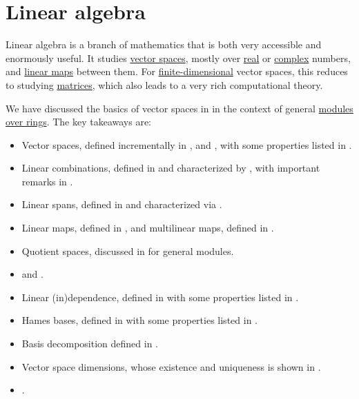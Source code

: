 \section{Linear algebra}\label{sec:linear_algebra}

Linear algebra is a branch of mathematics that is both very accessible and enormously useful. It studies \hyperref[def:vector_space]{vector spaces}, mostly over \hyperref[def:set_of_real_numbers]{real} or \hyperref[def:set_of_complex_numbers]{complex} numbers, and \hyperref[def:semimodule/homomorphism]{linear maps} between them. For \hyperref[def:vector_space_dimension]{finite-dimensional} vector spaces, this reduces to studying \hyperref[def:array/matrix]{matrices}, which also leads to a very rich computational theory.

We have discussed the basics of vector spaces in  in the context of general \hyperref[def:module]{modules over rings}. The key takeaways are:
\begin{itemize}
  \item Vector spaces, defined incrementally in ,  and , with some properties listed in .
  \item Linear combinations, defined in  and characterized by , with important remarks in .
  \item Linear spans, defined in  and characterized via .
  \item Linear maps, defined in , and multilinear maps, defined in .
  \item Quotient spaces, discussed in  for general modules.
  \item {} and .
  \item Linear (in)dependence, defined in  with some properties listed in .
  \item Hames bases, defined in  with some properties listed in .
  \item Basis decomposition defined in .
  \item Vector space dimensions, whose existence and uniqueness is shown in .
  \item {}.
\end{itemize}
